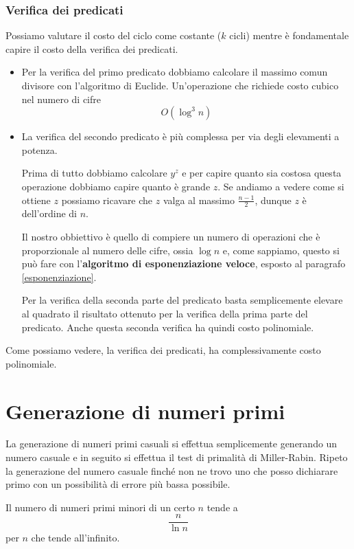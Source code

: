 \subsubsection{Verifica dei predicati}
Possiamo valutare il costo del ciclo come costante ($k$ cicli) mentre \`e fondamentale capire il costo della verifica
dei predicati.
\begin{itemize}
	\item Per la verifica del primo predicato dobbiamo calcolare il massimo comun divisore con l'algoritmo di Euclide.
	      Un'operazione che richiede costo cubico nel numero di cifre
	      \[ O(\log^3 n) \]
	\item La verifica del secondo predicato \`e pi\`u complessa per via degli elevamenti a potenza.

	      Prima di tutto dobbiamo calcolare $y^z$ e per capire quanto sia costosa questa operazione dobbiamo capire
	      quanto \`e grande $z$. Se andiamo a vedere come si ottiene $z$ possiamo ricavare che $z$ valga al massimo
	      $\frac{n-1}{2}$, dunque $z$ \`e dell'ordine di $n$.

	      Il nostro obbiettivo \`e quello di compiere un numero di operazioni che \`e proporzionale al numero delle
	      cifre, ossia $\log n$ e, come sappiamo, questo si pu\`o fare con l'\textbf{algoritmo di esponenziazione
		      veloce}, esposto al paragrafo \ref{esponenziazione}.

	      Per la verifica della seconda parte del predicato basta semplicemente elevare al quadrato il risultato ottenuto
	      per la verifica della prima parte del predicato. Anche questa seconda verifica ha quindi costo polinomiale.
\end{itemize}
Come possiamo vedere, la verifica dei predicati, ha complessivamente costo polinomiale.

\section{Generazione di numeri primi}\label{generazione_primi}
La generazione di numeri primi casuali si effettua semplicemente generando un numero casuale e in seguito si effettua
il test di primalit\`a di Miller-Rabin. Ripeto la generazione del numero casuale finch\'e non ne trovo uno che posso
dichiarare primo con un possibilit\`a di errore pi\`u bassa possibile.

\begin{theorem}
	Il numero di numeri primi minori di un certo $n$ tende a
	\[ \frac{n}{\ln n} \]
	per $n$ che tende all'infinito.
\end{theorem}

